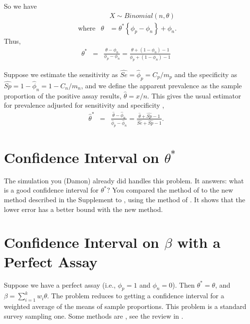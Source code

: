 \documentclass{article}
\begin{document}
So we have 
\begin{eqnarray*}
& & X \sim Binomial \left(n, \theta \right)  \\
\mbox{ where} & \theta & = \theta^* \left\{ \phi_p - \phi_n \right\} + \phi_n.
\end{eqnarray*}
Thus, 
\begin{eqnarray}
\theta^* & =  & \frac{ \theta - \phi_n }{ \phi_p - \phi_n}  = \frac{ \theta + (1 - \phi_n) -1  }{ \phi_p + (1 - \phi_n) -1 } \label{eq:thetastar}
\end{eqnarray}

Suppose we estimate the sensitivity as $\widehat{Se} = \hat{\phi}_p = C_p/m_p$ and the specificity as $\widehat{Sp} = 1-\hat{\phi}_n = 1- C_n/m_n$,
and we define the apparent prevalence as the sample proportion of the positive assay results, $\hat{\theta} = x/n$.
This gives the usual estimator for  prevalence adjusted for sensitivity and specificity
 \citep[see e.g.,][]{Roga:1978},
\begin{eqnarray*}
\hat{\theta}^* & = & \frac{ \hat{\theta} - \hat{\phi}_n }{\hat{\phi}_p - \hat{\phi}_n} = \frac{ \hat{\theta} + \widehat{Sp} -1 }{\widehat{Se} + \widehat{Sp} -1}.
\end{eqnarray*}
 
 
\section{Confidence Interval on $\theta^*$}
\label{sec-thetastar}

The simulation you (Damon) already did handles this problem. It answers: what is a good confidence interval for $\theta^*$?
You compared the method of \citet{Lang:2014} to the new method described in the Supplement to \citet{Kali:2021}, using the method of \citet{FayP:2015}.
It shows that the lower error has a better bound with the new method. 

\section{Confidence Interval on $\beta$ with a Perfect Assay}
\label{sec-betaPerfect}


Suppose we have a perfect assay (i.e., $\phi_p=1$ and $\phi_n=0$). Then $\theta^* = \theta$, and $\beta = \sum_{i=1}^{k} w_i \theta$. 
The problem reduces to getting a confidence interval for a weighted average of the means of sample proportions. 
This problem is a standard survey sampling one. Some methods are \citet{Korn:1998}, see the review in \citet{Dean:2015}. 
\end{document}
